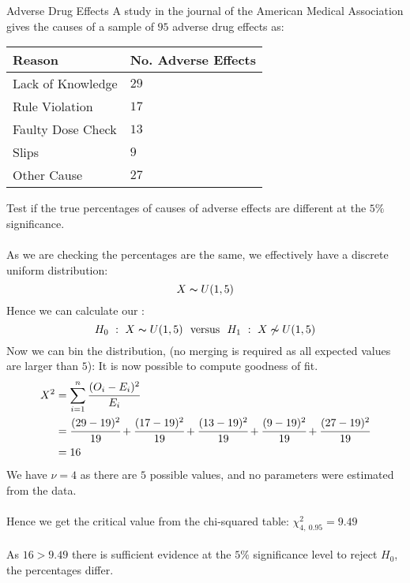 \begin{examplebox}{Adverse Drug Effects}
A study in the journal of the American Medical Association gives the causes of a sample of $95$ adverse drug effects as:
\begin{center}
	\begin{tabular}{l l}
		\textbf{Reason}   & \textbf{No. Adverse Effects} \\
		\hline
		Lack of Knowledge & $29$                         \\
		Rule Violation    & $17$                         \\
		Faulty Dose Check & $13$                         \\
		Slips             & $9$                          \\
		Other Cause       & $27$                         \\
	\end{tabular}
\end{center}
Test if the true percentages of causes of adverse effects are different at the $5\%$ significance.
\\
\\ As we are checking the percentages are the same, we effectively have a discrete uniform distribution:
\[X \thicksim U(1,5)\]
Hence we can calculate our :
\[H_0 \ : \ X \thicksim U(1,5) \ \text{  versus  } \ H_1 \ : \ X \not\thicksim U(1,5)\]
Now we can bin the distribution, (no merging is required as all expected values are larger than $5$):
It is now possible to compute goodness of fit.
\[\begin{split}
		X^2 &= \sum_{i=1}^n\cfrac{(O_i-E_i)^2}{E_i} \\
		&= \cfrac{(29 - 19)^2}{19} + \cfrac{(17 - 19)^2}{19} + \cfrac{(13 - 19)^2}{19} + \cfrac{(9 - 19)^2}{19} + \cfrac{(27 - 19)^2}{19} \\
		&= 16 \\
	\end{split}\]
We have $\nu = 4$ as there are $5$ possible values, and no parameters were estimated from the data.
\\
\\ Hence we get the critical value from the chi-squared table: $\chi^2_{4, \ 0.95} = 9.49$
\\
\\ As $16 > 9.49$ there is sufficient evidence at the $5\%$ significance level to reject $H_0$, the percentages differ.
\end{examplebox}
